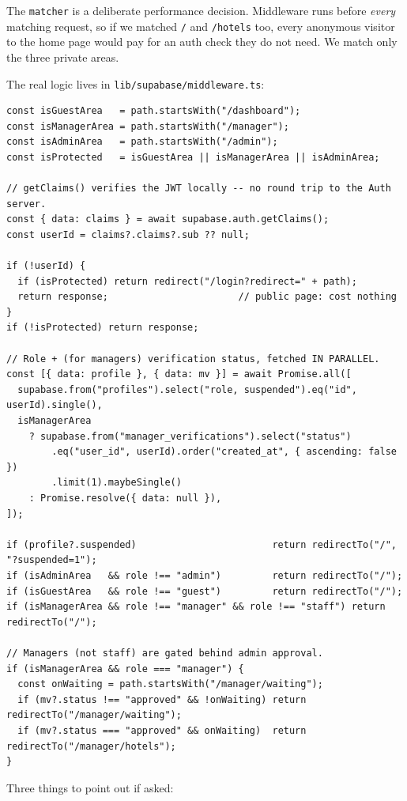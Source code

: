 \documentclass[11pt,a4paper]{article}
\newcommand{\file}[1]{\texttt{\small #1}}
\begin{document}
The \texttt{matcher} is a deliberate performance decision. Middleware runs
before \emph{every} matching request, so if we matched \texttt{/} and
\texttt{/hotels} too, every anonymous visitor to the home page would pay for an
auth check they do not need. We match only the three private areas.

The real logic lives in \file{lib/supabase/middleware.ts}:

\begin{lstlisting}[language=TS,caption={lib/supabase/middleware.ts --- the access-control cascade}]
const isGuestArea   = path.startsWith("/dashboard");
const isManagerArea = path.startsWith("/manager");
const isAdminArea   = path.startsWith("/admin");
const isProtected   = isGuestArea || isManagerArea || isAdminArea;

// getClaims() verifies the JWT locally -- no round trip to the Auth server.
const { data: claims } = await supabase.auth.getClaims();
const userId = claims?.claims?.sub ?? null;

if (!userId) {
  if (isProtected) return redirect("/login?redirect=" + path);
  return response;                       // public page: cost nothing
}
if (!isProtected) return response;

// Role + (for managers) verification status, fetched IN PARALLEL.
const [{ data: profile }, { data: mv }] = await Promise.all([
  supabase.from("profiles").select("role, suspended").eq("id", userId).single(),
  isManagerArea
    ? supabase.from("manager_verifications").select("status")
        .eq("user_id", userId).order("created_at", { ascending: false })
        .limit(1).maybeSingle()
    : Promise.resolve({ data: null }),
]);

if (profile?.suspended)                        return redirectTo("/", "?suspended=1");
if (isAdminArea   && role !== "admin")         return redirectTo("/");
if (isGuestArea   && role !== "guest")         return redirectTo("/");
if (isManagerArea && role !== "manager" && role !== "staff") return redirectTo("/");

// Managers (not staff) are gated behind admin approval.
if (isManagerArea && role === "manager") {
  const onWaiting = path.startsWith("/manager/waiting");
  if (mv?.status !== "approved" && !onWaiting) return redirectTo("/manager/waiting");
  if (mv?.status === "approved" && onWaiting)  return redirectTo("/manager/hotels");
}
\end{lstlisting}

Three things to point out if asked:
\end{document}
